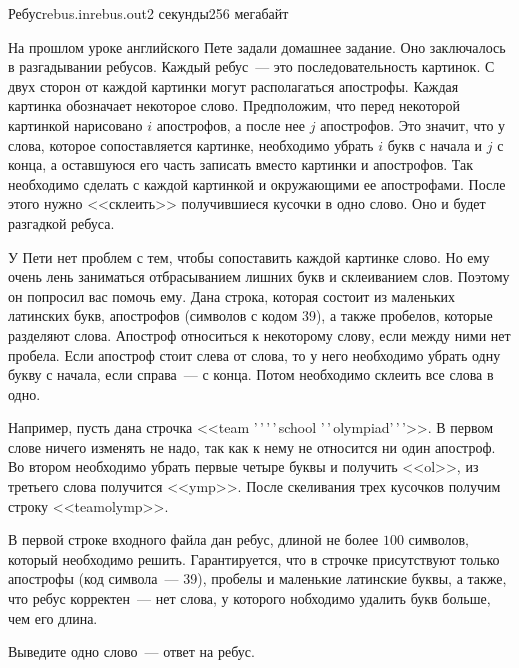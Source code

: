\begin{problem}{Ребус}{rebus.in}{rebus.out}{2 секунды}{256 мегабайт}


На прошлом уроке английского Пете задали домашнее задание. Оно заключалось
в разгадывании ребусов. Каждый ребус~--- это последовательность картинок. 
С двух сторон от каждой картинки могут располагаться апострофы. Каждая картинка
обозначает некоторое слово. Предположим, что перед некоторой картинкой 
нарисовано $i$ апострофов, а после нее $j$ апострофов. Это значит, что у слова, которое
сопоставляется картинке, необходимо убрать $i$ букв с начала и $j$ с конца,
а оставшуюся его часть записать вместо картинки и апострофов. Так необходимо
сделать с каждой картинкой и окружающими ее апострофами. После этого нужно
<<склеить>> получившиеся кусочки в одно слово. Оно и будет разгадкой ребуса.

У Пети нет проблем с тем, чтобы сопоставить каждой картинке слово. Но ему очень
лень заниматься отбрасыванием лишних букв и склеиванием слов. Поэтому он
попросил вас помочь ему. Дана строка, которая состоит из маленьких 
латинских букв, апострофов (символов с кодом 39), а также пробелов,
которые разделяют слова. Апостроф относиться к некоторому слову, если между 
ними нет пробела. Если апостроф стоит слева от слова, то у него необходимо
убрать одну букву с начала, если справа~--- с конца. Потом необходимо склеить
все слова в одно.
 
Например, пусть дана строчка <<team '\,'\,'\,'\,school 
'\,'\,olympiad'\,'\,'>>. В первом слове ничего изменять не надо, так как
к нему не относится ни один апостроф. Во втором необходимо убрать первые четыре
буквы и получить <<ol>>, из третьего слова получится <<ymp>>. После скеливания
трех кусочков получим строку <<teamolymp>>.

\InputFile
В первой строке входного файла дан ребус, длиной не более $100$ символов, 
который необходимо решить. Гарантируется, что в строчке присутствуют только 
апострофы (код символа~--- 39), пробелы и маленькие латинские буквы,
а также, что ребус корректен~--- нет слова, у которого нобходимо удалить
букв больше, чем его длина. 

\OutputFile
Выведите одно слово~--- ответ на ребус.

\Examples

\begin{example}%
%
\end{example}

\end{problem}
